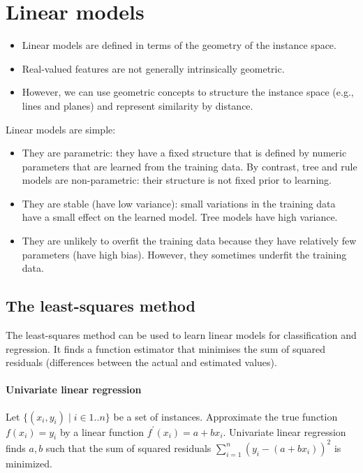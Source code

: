 \section{Linear models}

\begin{itemize}
      \item Linear models are defined in terms of the geometry of the instance space.
      \item Real-valued features are not generally intrinsically geometric.
      \item However, we can use geometric concepts to structure the instance space
            (e.g., lines and planes) and represent similarity by distance.
\end{itemize}

Linear models are simple:

\begin{itemize}
      \item They are parametric: they have a fixed structure that is defined by
            numeric parameters that are learned from the training data.
            By contrast, tree and rule models are non-parametric: their structure
            is not fixed prior to learning.
      \item They are stable (have low variance): small variations in the training
            data have a small effect on the learned model.
            Tree models have high variance.
      \item They are unlikely to overfit the training data because they have
            relatively few parameters (have high bias).
            However, they sometimes underfit the training data.
\end{itemize}

\subsection{The least-squares method}

The least-squares method can be used to learn linear models for classification
and regression.
It finds a function estimator that minimises the sum of squared residuals
(differences between the actual and estimated values).

\paragraph{Univariate linear regression}

Let $\{ (x_i, y_i) \mid i \in 1 .. n \}$ be a set of instances.
Approximate the true function $f(x_i) = y_i$ by a linear function
$f^\prime(x_i) = a + b x_i$.
Univariate linear regression finds $a, b$ such that the sum of squared
residuals $\sum_{i = 1}^{n} (y_i - (a + b x_i))^2$ is minimized.

